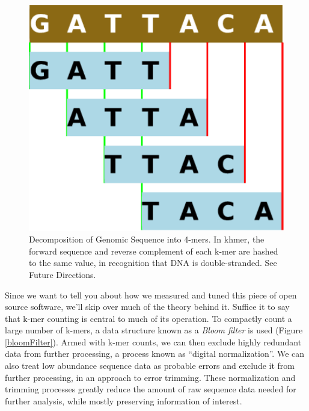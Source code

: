 \documentclass{article}
\begin{document}
\begin{figure}[ht!]
\centering
\includegraphics[scale=0.5]{kmers.pdf}
\caption{Decomposition of Genomic Sequence into 4-mers.  In khmer, the forward sequence and reverse complement of each k-mer are hashed to the same value, in recognition that DNA is double-stranded.  See Future Directions.}
\label{kmers}
\end{figure}


Since we want to tell you about how we measured and tuned this piece of open
source software, we'll skip over much of the theory behind it. Suffice it to
say that k-mer counting is central to much of its operation. To compactly count
a large number of k-mers, a data structure known as a \textit{Bloom filter}
\cite{web:BloomFilter} is used (Figure \ref{bloomFilter}). Armed with k-mer counts, we can then exclude
highly redundant data from further processing, a process known as
``digital normalization''. We can also treat low
abundance sequence data as probable errors and exclude it from further
processing, in an approach to error trimming.  These normalization and
trimming processes greatly reduce
the amount of raw sequence data needed for further analysis, while mostly
preserving information of interest.
\end{document}
